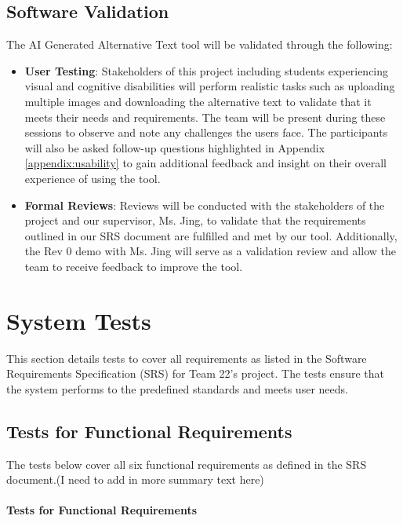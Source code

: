 \documentclass[12pt, titlepage]{article}
\begin{document}
\subsection{Software Validation}
The AI Generated Alternative Text tool will be validated through the following:
\begin{itemize}
  \item \textbf{User Testing}: Stakeholders of this project including
    students experiencing visual
    and cognitive disabilities will perform realistic tasks such as
    uploading multiple images and downloading the alternative text
    to validate that it meets their needs and requirements.
    The team will be present during these sessions to observe and
    note any challenges
    the users face. The participants will also be asked follow-up
    questions highlighted in Appendix \ref{appendix:usability} to
    gain additional feedback and insight
    on their overall experience of using the tool.
  \item \textbf{Formal Reviews}: Reviews will be conducted with the
    stakeholders of the project and our supervisor, Ms. Jing, to
    validate that the requirements
    outlined in our SRS document are fulfilled and met by our tool.
    Additionally, the Rev 0 demo with Ms. Jing will serve as a
    validation review and allow the team
    to receive feedback to improve the tool.
\end{itemize}

\section{System Tests}
\label{System Tests Desc}

This section details tests to cover all requirements as listed in the
Software Requirements Specification (SRS) for Team 22's project. The
tests ensure that the system performs to the predefined standards and
meets user needs.

\subsection{Tests for Functional Requirements}

The tests below cover all six functional requirements as defined in
the SRS document.(I need to add in more summary text here)

\paragraph{Tests for Functional Requirements}
\end{document}
